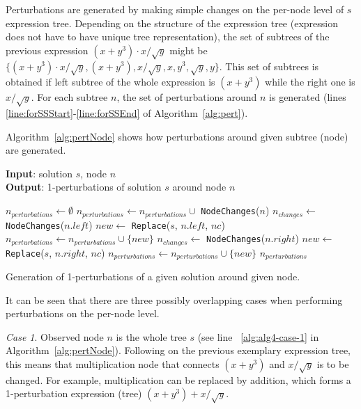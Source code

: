 \documentclass[a4paper,12pt]{elsarticle}
\begin{document}
Perturbations are generated by making simple changes on the per-node level of $s$ expression tree.
Depending on the structure of the expression tree (expression does not have to have unique tree representation), the set of subtrees of the previous expression $(x+y^3)\cdot x/\sqrt{y}$ might be $\{(x+y^3)\cdot x/\sqrt{y}, (x+y^3), x/\sqrt{y}, x, y^3, \sqrt{y}, y\}$. This set of subtrees is obtained if left subtree of the whole expression is $(x+y^3)$ while the right one is $x/\sqrt{y}$. 
For each subtree $n$, the set of perturbations around $n$ is generated (lines \ref{line:forSSStart}-\ref{line:forSSEnd} of Algorithm~\ref{alg:pert}).   


Algorithm~\ref{alg:pertNode} shows how perturbations around given subtree (node) are generated.

\begin{algorithm}	
	\hspace*{\algorithmicindent} \textbf{Input}: solution $s$, node $n$\\
	\hspace*{\algorithmicindent} \textbf{Output}: 1-perturbations of solution $s$ around node $n$
	\begin{algorithmic}[1]
		\State $n_{perturbations} \gets \emptyset$
		 \label{alg:alg4-case-1}
		\State $n_{perturbations} \gets n_{perturbations} \cup$ \texttt{NodeChanges}($n$)
		\EndIf
		\label{alg:alg4-case-2}
		\State $n_{changes} \gets$ \texttt{NodeChanges}($n.left$)
		\State $new \gets$ \texttt{Replace}($s$, $n.left$, $nc$)
		\State $n_{perturbations} \gets n_{perturbations} \cup \{new\}$
		\EndFor
		\EndIf
		\label{alg:alg4-case-3}
		\State $n_{changes} \gets$ \texttt{NodeChanges}($n.right$)
		\State $new \gets$ \texttt{Replace}($s$, $n.right$, $nc$)
		\State $n_{perturbations} \gets n_{perturbations} \cup \{new\}$
		\EndFor
		\EndIf
		\State \Return $n_{perturbations}$
		\EndProcedure
	\end{algorithmic}
	\caption{Generation of 1-perturbations of a given solution around given node.}
	\label{alg:pertNode}
\end{algorithm}

It can be seen that there are three possibly overlapping cases when performing perturbations on the per-node level. 

\emph{Case 1}. 
Observed node $n$ is the whole tree $s$ (see line ~\ref{alg:alg4-case-1} in Algorithm~\ref{alg:pertNode}). Following on   the previous exemplary expression tree, this means that multiplication node that connects $(x+y^3)$ and $x/\sqrt{y}$ is to be changed. For example, multiplication can be replaced by addition, which forms a 1-perturbation expression (tree) $(x+y^3)+ x/\sqrt{y}$. 
\end{document}

